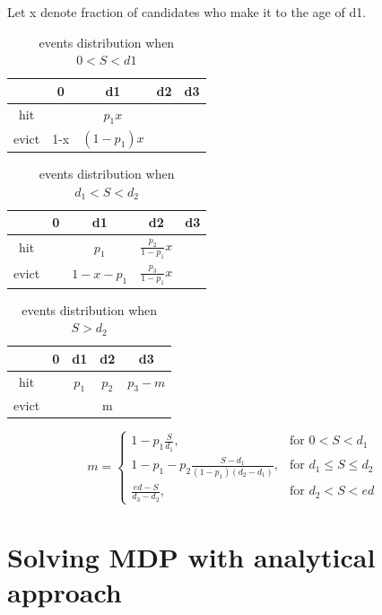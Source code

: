 \documentclass[12pt, letterpaper]{article}
\begin{document}
Let x denote fraction of candidates who make it to the age of d1.

\begin{table}[H]
\begin{center}
\begin{tabular}{c|c c c c}
\hline
 & 0 & d1 & d2 & d3 \\
 \hline
hit & & $p_1 x$ & \\
evict & 1-x & $(1-p_1) x$ & \\
\end{tabular}
\caption{events distribution when $0<S<d1$}
\end{center}
\end{table}

\begin{table}[H]
\begin{center}
\begin{tabular}{c|c c c c}
\hline
 & 0 & d1 & d2 & d3 \\
 \hline
hit & & $p_1$ & $\frac{p_2}{1-p_1}x$ &\\
evict & & $1-x-p_1$ & $\frac{p_3}{1-p_1}x$ & \\
\end{tabular}
\caption{events distribution when $d_1<S<d_2$}
\end{center}
\end{table}

\begin{table}[H]
\begin{center}
\begin{tabular}{c|c c c c}
\hline
 & 0 & d1 & d2 & d3 \\
 \hline
hit & & $p_1$ & $p_2$ & $p_3-m$ \\
evict & & & m & \\
\end{tabular}
\caption{events distribution when $S>d_2$}
\end{center}
\end{table}

\[
m = \left\{\begin{array}{lr}
      1-p_1\frac{S}{d_1}, & \text{for } 0 < S < d_1 \\
      1-p_1-p_2\frac{S-d_1}{(1-p_1)(d_2-d_1)}, & \text{for } d_1 \leq S \leq d_2 \\
      \frac{ed-S}{d_3-d_2}, & \text{for } d_2 < S < ed
           \end{array}
           \right.
\]

\section{Solving MDP with analytical approach}
\end{document}
